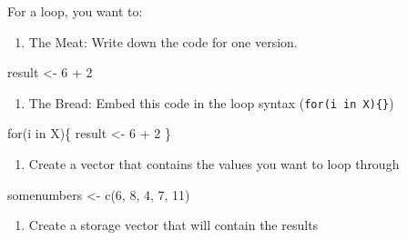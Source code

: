 \documentclass[
  letterpaper,
  DIV=11,
  numbers=noendperiod]{scrreprt}
\newenvironment{Shaded}{\begin{snugshade}}{\end{snugshade}}
\newcommand{\ControlFlowTok}[1]{\textcolor[rgb]{0.00,0.23,0.31}{#1}}
\newcommand{\DecValTok}[1]{\textcolor[rgb]{0.68,0.00,0.00}{#1}}
\newcommand{\FunctionTok}[1]{\textcolor[rgb]{0.28,0.35,0.67}{#1}}
\newcommand{\NormalTok}[1]{\textcolor[rgb]{0.00,0.23,0.31}{#1}}
\newcommand{\OtherTok}[1]{\textcolor[rgb]{0.00,0.23,0.31}{#1}}
\newcommand{\SpecialCharTok}[1]{\textcolor[rgb]{0.37,0.37,0.37}{#1}}
\providecommand{\tightlist}{%
  \setlength{\itemsep}{0pt}\setlength{\parskip}{0pt}}\usepackage{longtable,booktabs,array}
\begin{document}
For a loop, you want to:

\begin{enumerate}
\def\labelenumi{\arabic{enumi}.}
\tightlist
\item
  The Meat: Write down the code for one version.
\end{enumerate}

\begin{Shaded}
\begin{Highlighting}[]
\NormalTok{result }\OtherTok{\textless{}{-}} \DecValTok{6} \SpecialCharTok{+} \DecValTok{2}
\end{Highlighting}
\end{Shaded}

\begin{enumerate}
\def\labelenumi{\arabic{enumi}.}
\setcounter{enumi}{1}
\tightlist
\item
  The Bread: Embed this code in the loop syntax
  (\texttt{for(i\ in\ X)\{\}})
\end{enumerate}

\begin{Shaded}
\begin{Highlighting}[]
\ControlFlowTok{for}\NormalTok{(i }\ControlFlowTok{in}\NormalTok{ X)\{}
\NormalTok{    result }\OtherTok{\textless{}{-}} \DecValTok{6} \SpecialCharTok{+} \DecValTok{2}
\NormalTok{    \}}
\end{Highlighting}
\end{Shaded}

\begin{enumerate}
\def\labelenumi{\arabic{enumi}.}
\setcounter{enumi}{2}
\tightlist
\item
  Create a vector that contains the values you want to loop through
\end{enumerate}

\begin{Shaded}
\begin{Highlighting}[]
\NormalTok{somenumbers }\OtherTok{\textless{}{-}} \FunctionTok{c}\NormalTok{(}\DecValTok{6}\NormalTok{, }\DecValTok{8}\NormalTok{, }\DecValTok{4}\NormalTok{, }\DecValTok{7}\NormalTok{, }\DecValTok{11}\NormalTok{)}
\end{Highlighting}
\end{Shaded}

\begin{enumerate}
\def\labelenumi{\arabic{enumi}.}
\setcounter{enumi}{3}
\tightlist
\item
  Create a storage vector that will contain the results
\end{enumerate}
\end{document}
